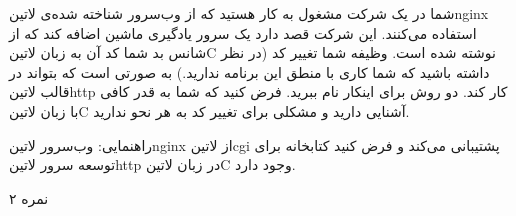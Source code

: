 
شما در یک شرکت مشغول به کار هستید که از وب‌سرور شناخته شده‌ی ‌لاتین{nginx} استفاده می‌کنند. این شرکت قصد دارد یک سرور یادگیری ماشین اضافه کند که از شانس بد شما کد آن به زبان ‌لاتین{C} نوشته شده است.
وظیفه شما تغییر کد (در نظر داشته باشید که شما کاری با منطق این برنامه ندارید.) به صورتی است که بتواند در قالب ‌لاتین{http} کار کند.
دو روش برای اینکار نام ببرید. فرض کنید که شما به قدر کافی با زبان ‌لاتین{C} آشنایی دارید و مشکلی برای تغییر کد به هر نحو ندارید.

راهنمایی: وب‌سرور ‌لاتین{nginx} از ‌لاتین{cgi} پشتیبانی می‌کند و فرض کنید کتابخانه برای توسعه سرور ‌لاتین{http} در زبان ‌لاتین{C} وجود دارد.

۲ نمره
